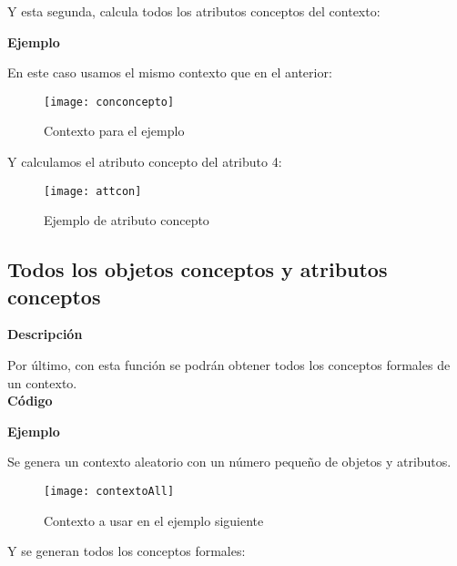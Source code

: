         

        Y esta segunda, calcula todos los atributos conceptos del contexto:
        

        \clearpage

        \textbf{Ejemplo}

        En este caso usamos el mismo contexto que en el anterior:

        \begin{figure}[H]
            \centering
            \texttt{[image: conconcepto]}
            \caption{Contexto para el ejemplo}
            \label{fig:conconcepto}
        \end{figure}

        Y calculamos el atributo concepto del atributo 4:

        \begin{figure}[H]
            \centering
            \texttt{[image: attcon]}
            \caption{Ejemplo de atributo concepto}
            \label{fig:attcon}
        \end{figure}



    \subsection{Todos los objetos conceptos y atributos conceptos}
       
        
        \textbf{Descripci\'on}

        Por \'ultimo, con esta funci\'on se podr\'an obtener todos los conceptos formales de un contexto.
        \\


        \textbf{C\'odigo}

        

        \bigskip

        \textbf{Ejemplo}

        Se genera un contexto aleatorio con un n\'umero peque\~no de objetos y atributos.

        \begin{figure}[H]
            \centering
            \texttt{[image: contextoAll]}
            \caption{Contexto a usar en el ejemplo siguiente}
            \label{fig:contextoAll}
        \end{figure}
        
        \bigskip
        Y se generan todos los conceptos formales:


